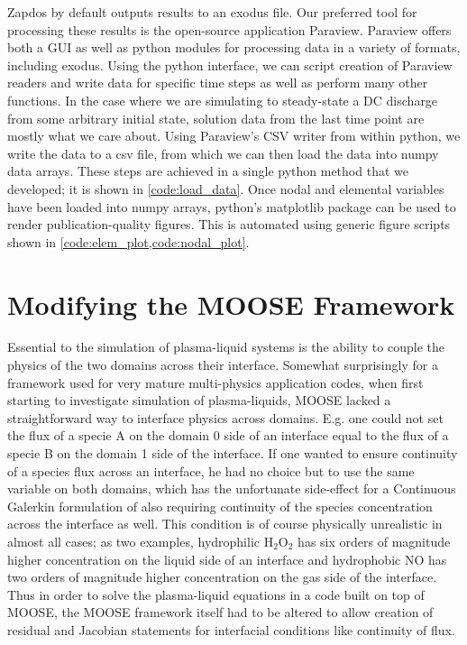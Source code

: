 Zapdos by default outputs results to an exodus file. Our preferred tool for processing these results is the open-source application Paraview. \cite{paraview} Paraview offers both a GUI as well as python modules for processing data in a variety of formats, including exodus. Using the python interface, we can script creation of Paraview readers and write data for specific time steps as well as perform many other functions. In the case where we are simulating to steady-state a DC discharge from some arbitrary initial state, solution data from the last time point are mostly what we care about. Using Paraview's CSV writer from within python, we write the data to a csv file, from which we can then load the data into numpy data arrays. These steps are achieved in a single python method that we developed; it is shown in \cref{code:load_data}. Once nodal and elemental variables have been loaded into numpy arrays, python's matplotlib package can be used to render publication-quality figures. This is automated using generic figure scripts shown in \cref{code:elem_plot,code:nodal_plot}.


\section{Modifying the MOOSE Framework}
\label{sec:moose}

Essential to the simulation of plasma-liquid systems is the ability to couple the physics of the two domains across their interface. Somewhat surprisingly for a framework used for very mature multi-physics application codes, when first starting to investigate simulation of plasma-liquids, MOOSE lacked a straightforward way to interface physics across domains. E.g. one could not set the flux of a specie A on the domain 0 side of an interface equal to the flux of a specie B on the domain 1 side of the interface. If one wanted to ensure continuity of a species flux across an interface, he had no choice but to use the same variable on both domains, which has the unfortunate side-effect for a Continuous Galerkin formulation of also requiring continuity of the species concentration across the interface as well. This condition is of course physically unrealistic in almost all cases; as two examples, hydrophilic H$_2$O$_2$ has six orders of magnitude higher concentration on the liquid side of an interface and hydrophobic NO has two orders of magnitude higher concentration on the gas side of the interface. Thus in order to solve the plasma-liquid equations in a code built on top of MOOSE, the MOOSE framework itself had to be altered to allow creation of residual and Jacobian statements for interfacial conditions like continuity of flux.

